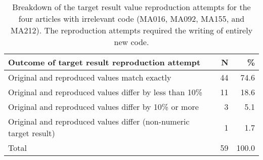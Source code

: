 \begin{table}[htbp]
\centering
\begin{tabular}{lrr}
  \hline
Outcome of target result reproduction attempt & N & \% \\ 
  \hline
Original and reproduced values match exactly & 44 & 74.6 \\ 
  Original and reproduced values differ by less than 10\% & 11 & 18.6 \\ 
  Original and reproduced values differ by 10\% or more & 3 & 5.1 \\ 
  Original and reproduced values differ (non-numeric target result) & 1 & 1.7 \\ 
  Total & 59 & 100.0 \\ 
   \hline
\end{tabular}
\caption{Breakdown of the target result value reproduction attempts for the four articles with irrelevant code (MA016, MA092, MA155, and MA212). The reproduction attempts required the writing of entirely new code.} 
\label{tab:ma_res_repro_summary_owncode}
\end{table}
